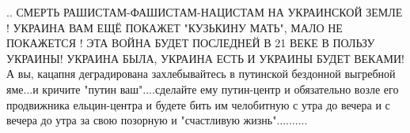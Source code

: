  
 
 
 
 

.. СМЕРТЬ РАШИСТАМ-ФАШИСТАМ-НАЦИСТАМ НА УКРАИНСКОЙ ЗЕМЛЕ ! УКРАИНА ВАМ ЕЩЁ
ПОКАЖЕТ "КУЗЬКИНУ МАТЬ", МАЛО НЕ ПОКАЖЕТСЯ ! ЭТА ВОЙНА БУДЕТ ПОСЛЕДНЕЙ В 21
ВЕКЕ В ПОЛЬЗУ УКРАИНЫ! УКРАИНА БЫЛА, УКРАИНА ЕСТЬ И УКРАИНЫ БУДЕТ ВЕКАМИ! А вы,
кацапня деградирована захлебывайтесь в путинской бездонной выгребной яме...и
кричите "путин ваш"....сделайте ему путин-центр и обязательно возле его
продвижника ельцин-центра и будете бить им челобитную с утра до вечера и с
вечера до утра за свою позорную и "счастливую жизнь"..........
